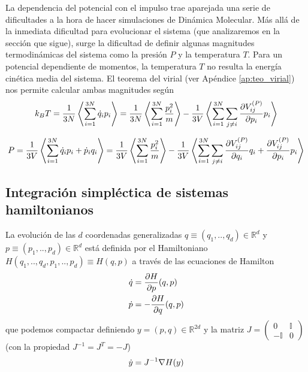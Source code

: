 La dependencia del potencial con el impulso trae aparejada una serie de dificultades a la hora de hacer simulaciones de Dinámica Molecular.
Más allá de la inmediata dificultad para evolucionar el sistema (que analizaremos en la sección que sigue), surge la dificultad de definir algunas magnitudes termodinámicas del
sistema como la presión $P$ y la temperatura $T$.
Para un potencial dependiente de momentos, la temperatura $T$ no resulta la energía cinética media del sistema.
El teorema del virial (ver Apéndice \ref{ap:teo_virial}) nos permite calcular ambas magnitudes según
\begin{equation}{\label{eq:virial_T}}
k_B T =  \frac{1}{3N}\left<\sum_{i=1}^{3N} \dot{q}_ip_i \right>
=  \frac{1}{3N}\left<\sum_{i=1}^{3N} \frac{p_i^2}{m} \right> - \frac{1}{3V}\left< \sum_{i=1}^{3N}\sum_{j\neq i} \frac{\partial V_{ij}^{(P)}}{\partial p_i}p_i \right>
\end{equation}

\begin{equation}{\label{eq:virial_P}}
P = \frac{1}{3V}\left< \sum_{i=1}^{3N} \dot{q}_ip_i + \dot{p}_iq_i \right>
= \frac{1}{3V}\left< \sum_{i=1}^{3N} \frac{p_i^2}{m} \right> - \frac{1}{3V}\left< \sum_{i=1}^{3N}\sum_{j\neq i} \frac{\partial V_{ij}^{(P)}}{\partial q_i}q_i+\frac{\partial V_{ij}^{(P)}}{\partial p_i}p_i \right>
\end{equation}

\subsection{Integración simpléctica de sistemas hamiltonianos}

La evolución de las $d$ coordenadas generalizadas $q \equiv (q_1,..,q_d)\in\mathbb{R}^{d}$ y $p \equiv (p_1,..,p_d)\in\mathbb{R}^{d}$ está definida por el Hamiltoniano
$H(q_1,..,q_d,p_1,..,p_d) \equiv H(q,p)$  a través de las ecuaciones de Hamilton
\begin{align*}
 \dot{q} &= \frac{\partial H}{\partial p}(q,p) \\
 \dot{p} &= -\frac{\partial H}{\partial q}(q,p)
\end{align*}
que podemos compactar definiendo $y=(p,q)\in\mathbb{R}^{2d}$ y la matriz $J = \begin{pmatrix}0 & \mathbb{I} \\-\mathbb{I} & 0\end{pmatrix}$ (con la propiedad $J^{-1} = J^T = -J$)
\begin{equation}{\label{eq:ec_hamilton}}
 \dot{y} = J^{-1}\nabla H(y)
\end{equation}

